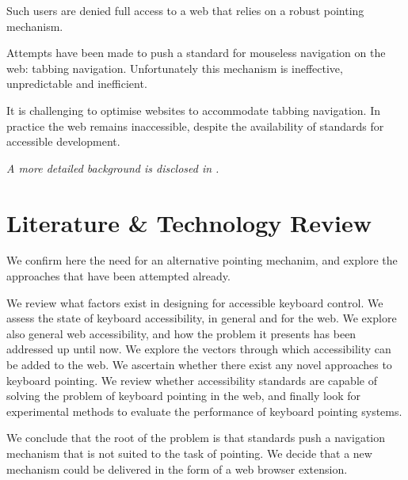 \documentclass[a4paper, 12pt]{report}
\begin{document}
Such users are denied full access to a web that relies on a robust pointing mechanism.

Attempts have been made to push a standard for mouseless navigation on the web: tabbing navigation. Unfortunately this mechanism is ineffective, unpredictable and inefficient.

It is challenging to optimise websites to accommodate tabbing navigation. In practice the web remains inaccessible, despite the availability of standards for accessible development.

\textit{A more detailed background is disclosed in .}
\section{Literature \& Technology Review}
We confirm here the need for an alternative pointing mechanim, and explore the approaches that have been attempted already.

We review what factors exist in designing for accessible keyboard control. We assess the state of keyboard accessibility, in general and for the web. We explore also general web accessibility, and how the problem it presents has been addressed up until now. We explore the vectors through which accessibility can be added to the web. We ascertain whether there exist any novel approaches to keyboard pointing. We review whether accessibility standards are capable of solving the problem of keyboard pointing in the web, and finally look for experimental methods to evaluate the performance of keyboard pointing systems.

We conclude that the root of the problem is that standards push a navigation mechanism that is not suited to the task of pointing. We decide that a new mechanism could be delivered in the form of a web browser extension.
\end{document}
